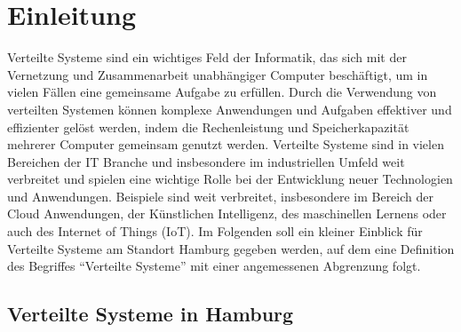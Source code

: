 \documentclass[../vs-script-first-v01.tex]{subfiles}
\begin{document}
\section{Einleitung}

Verteilte Systeme sind ein wichtiges Feld der Informatik, das sich mit der Vernetzung und Zusammenarbeit unabhängiger Computer beschäftigt, um in vielen Fällen eine gemeinsame Aufgabe zu erfüllen. Durch die Verwendung von verteilten Systemen können komplexe Anwendungen und Aufgaben effektiver und effizienter gelöst werden, indem die Rechenleistung und Speicherkapazität mehrerer Computer gemeinsam genutzt werden. Verteilte Systeme sind in vielen Bereichen der IT Branche und insbesondere im industriellen Umfeld weit verbreitet und spielen eine wichtige Rolle bei der Entwicklung neuer Technologien und Anwendungen. Beispiele sind weit verbreitet, insbesondere im Bereich der Cloud Anwendungen, der Künstlichen Intelligenz, des maschinellen Lernens oder auch des Internet of Things (IoT). Im Folgenden soll ein kleiner Einblick für Verteilte Systeme am Standort Hamburg gegeben werden, auf dem eine Definition des Begriffes \enquote{Verteilte Systeme}  mit einer angemessenen Abgrenzung folgt. 

\subsection{Verteilte Systeme in Hamburg}
\end{document}
